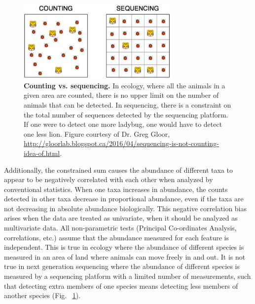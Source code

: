 \begin{figure}[h]
\begin{center}
\includegraphics[width=0.7\textwidth]{lions_ladybugs.png}
\caption[Counting vs. sequencing.]{\textbf{Counting vs. sequencing.} In ecology, where all the animals in a given area are counted, there is no upper limit on the number of animals that can be detected. In sequencing, there is a constraint on the total number of sequences detected by the sequencing platform. If one were to detect one more ladybug, one would have to detect one less lion. Figure courtesy of Dr. Greg Gloor, \url{http://gloorlab.blogspot.ca/2016/04/sequencing-is-not-counting-idea-of.html}.}
\label{introduction_lions_ladybugs}
\end{center}
\end{figure}

Additionally, the constrained sum causes the abundance of different taxa to appear to be negatively correlated with each other when analyzed by conventional statistics. When one taxa increases in abundance, the counts detected in other taxa decrease in proportional abundance, even if the taxa are not decreasing in absolute abundance biologically. This negative correlation bias arises when the data are treated as univariate, when it should be analyzed as multivariate data. All non-parametric tests (Principal Co-ordinates Analysis, correlations, etc.) assume that the abundance measured for each feature is independent. This is true in ecology where the abundance of different species is measured in an area of land where animals can move freely in and out. It is not true in next generation sequencing where the abundance of different species is measured by a sequencing platform with a limited number of measurements, such that detecting extra members of one species means detecting less members of another species (Fig. ~\ref{introduction_lions_ladybugs}).

